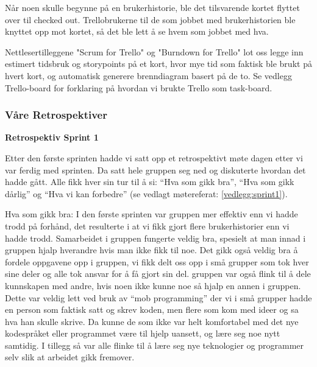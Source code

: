 \documentclass[12pt,a4paper,norsk]{article}
\begin{document}
    Når noen skulle begynne på en brukerhistorie, ble det tilsvarende kortet flyttet over til checked out. Trellobrukerne til de som jobbet med brukerhistorien ble knyttet opp mot kortet, så det ble lett å se hvem som jobbet med hva.
    
    Nettlesertilleggene "Scrum for Trello" og "Burndown for Trello" lot oss legge inn estimert tidsbruk og storypoints på et kort, hvor mye tid som faktisk ble brukt på hvert kort, og automatisk generere brenndiagram basert på de to. Se vedlegg Trello-board for forklaring på hvordan vi brukte Trello som task-board.
	\subsubsection{Våre Retrospektiver}
	
\bigskip \noindent \textbf{Retrospektiv Sprint 1}
\par Etter den første sprinten hadde vi satt opp et retrospektivt møte dagen etter vi var ferdig med sprinten. Da satt hele gruppen seg ned og diskuterte hvordan det hadde gått. Alle fikk hver sin tur til å si: “Hva som gikk bra”, “Hva som gikk dårlig” og “Hva vi kan forbedre” (se vedlagt møtereferat: \ref{vedlegg:sprint1}).
 
Hva som gikk bra:
I den første sprinten var gruppen mer effektiv enn vi hadde trodd på forhånd, det resulterte i at vi fikk gjort flere brukerhistorier enn vi hadde trodd. Samarbeidet i gruppen fungerte veldig bra, spesielt at man innad i gruppen hjalp hverandre hvis man ikke fikk til noe. Det gikk også veldig bra å fordele oppgavene opp i gruppen, vi fikk delt oss opp i små grupper som tok hver sine deler og alle tok ansvar for å få gjort sin del. gruppen var også flink til å dele kunnskapen med andre, hvis noen ikke kunne noe så hjalp en annen i gruppen. Dette var veldig lett ved bruk av “mob programming” der vi i små grupper hadde en person som faktisk satt og skrev koden, men flere som kom med ideer og sa hva han skulle skrive. Da kunne de som ikke var helt komfortabel med det nye kodespråket eller programmet være til hjelp uansett, og lære seg noe nytt samtidig. I tillegg så var alle flinke til å lære seg nye teknologier og programmer selv slik at arbeidet gikk fremover. 
\end{document}
